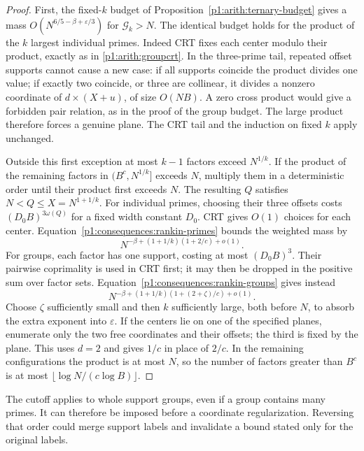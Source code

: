 \begin{proof}
First, the fixed-$k$ budget of
Proposition~\ref{p1:arith:ternary-budget} gives a mass
$O(N^{6/5-\beta+\varepsilon/3})$ for $\mathcal G_k>N$.
The identical budget holds for the product of the $k$ largest
individual primes. Indeed CRT fixes each center modulo their
product, exactly as in \eqref{p1:arith:groupcrt}. In the
three-prime tail, repeated offset supports cannot cause a
new case: if all supports coincide the product divides one
value; if exactly two coincide, or three are collinear, it
divides a nonzero coordinate of $d\times(X+u)$, of size
$O(NB)$. A zero cross product would give a forbidden pair
relation, as in the proof of the group budget. The large
product therefore forces a genuine plane. The CRT tail and
the induction on fixed $k$ apply unchanged.

Outside this first exception at most $k-1$ factors exceed
$N^{1/k}$. If the product of the remaining factors in
$(B^c,N^{1/k}]$ exceeds $N$, multiply them in a deterministic
order until their product first exceeds $N$. The resulting
$Q$ satisfies $N<Q\le X=N^{1+1/k}$.
For individual primes, choosing their three offsets costs
$(D_0B)^{3\omega(Q)}$ for a fixed width constant $D_0$.
CRT gives $O(1)$ choices for each center.
Equation~\eqref{p1:consequences:rankin-primes} bounds the
weighted mass by
\[
 N^{-\beta+(1+1/k)(1+2/c)+o(1)}.
\]
For groups, each factor has one support, costing at most
$(D_0B)^3$. Their pairwise coprimality is used in CRT first;
it may then be dropped in the positive sum over factor sets.
Equation~\eqref{p1:consequences:rankin-groups} gives instead
\[
 N^{-\beta+(1+1/k)(1+(2+\zeta)/c)+o(1)}.
\]
Choose $\zeta$ sufficiently small and then $k$ sufficiently
large, both before $N$, to absorb the extra exponent into
$\varepsilon$. If the centers lie on one of the specified
planes, enumerate only the two free coordinates and their
offsets; the third is fixed by the plane. This uses $d=2$
and gives $1/c$ in place of $2/c$. In the remaining
configurations the product is at most $N$, so the number
of factors greater than $B^c$ is at most
$\lfloor\log N/(c\log B)\rfloor$.
\end{proof}

The cutoff applies to whole support groups, even if a group
contains many primes. It can therefore be imposed before a
coordinate regularization. Reversing that order could merge
support labels and invalidate a bound stated only for the
original labels.

